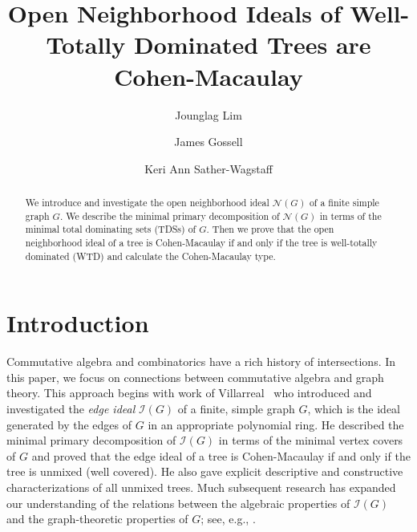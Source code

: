 \documentclass[12pt, reqno]{amsart}
\theoremstyle{definition}
\theoremstyle{plain}
\theoremstyle{definition}
\newcommand{\NN}{\mathcal{N}}
\newcommand{\II}{\mathcal{I}}
\begin{document}
\title[Open Neighborhood Ideals of Well Totally Dominated Trees]{Open Neighborhood Ideals of Well-Totally Dominated Trees are Cohen-Macaulay}

\author[Lim, et al]{Jounglag Lim}
\address{School of mathematical and statistical sciences, Clemson University, Clemson, SC 29634}

\author[]{James Gossell}
\address{Department of mathematics and statistics, University of Alaska, Fairbanks, AK 99775}

\author[]{Keri Ann Sather-Wagstaff}
\address{Framingham State University, Framingham, MA 01701}

\begin{abstract}
We introduce and investigate the open neighborhood ideal $\NN(G)$ of a finite simple graph $G$. We describe the minimal primary decomposition of $\NN(G)$ in terms of the minimal total dominating sets (TDSs) of $G$. Then we prove that the open neighborhood ideal of a tree is Cohen-Macaulay if and only if the tree is well-totally dominated (WTD) and calculate the Cohen-Macaulay type.
\end{abstract}


\maketitle
\setcounter{tocdepth}{1}
\tableofcontents

\section{Introduction}

Commutative algebra and combinatorics have a rich history of intersections.
In this paper, we focus on connections between commutative algebra and graph theory.
This approach begins with work of Villarreal~\cite{MR1031197} who introduced and investigated the \emph{edge ideal} $\II(G)$ of a finite, simple graph $G$, which is the ideal generated by the edges of $G$ in an appropriate polynomial ring. He described the minimal primary decomposition of $\II(G)$ in terms of the minimal vertex covers of $G$ and proved that the edge ideal of a tree is Cohen-Macaulay if and only if the tree is unmixed (well covered). He also gave explicit descriptive and constructive characterizations of all unmixed trees.
Much subsequent research has expanded our understanding of the relations between the algebraic properties of $\II(G)$ and the graph-theoretic properties of $G$; see, e.g., \cite{SCM_graphs,wei2019cohenmacaulay,MR2302553,MR2231097,MR1425502}.
\end{document}
